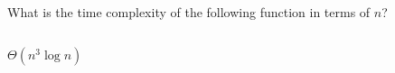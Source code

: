 \begin{prob}
    What is the time complexity of the following function in terms of $n$?

    \inputminted{python}{./code.py}

    \begin{soln}
        $\Theta(n^3 \log n)$
    \end{soln}

\end{prob}
